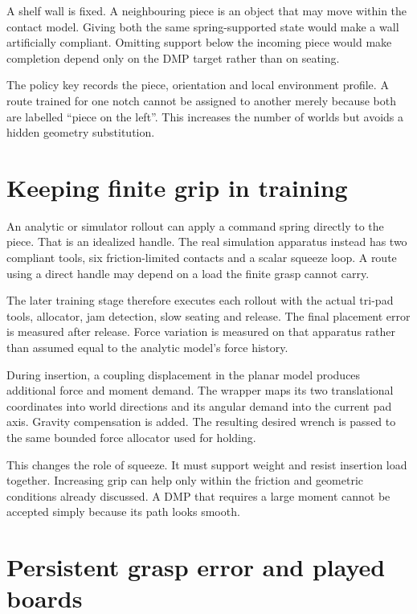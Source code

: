 A shelf wall is fixed. A neighbouring piece is an object that may move within the contact model. Giving both the same spring-supported state would make a wall artificially compliant. Omitting support below the incoming piece would make completion depend only on the DMP target rather than on seating.

The policy key records the piece, orientation and local environment profile. A route trained for one notch cannot be assigned to another merely because both are labelled ``piece on the left''. This increases the number of worlds but avoids a hidden geometry substitution.

\section{Keeping finite grip in training}

An analytic or simulator rollout can apply a command spring directly to the piece. That is an idealized handle. The real simulation apparatus instead has two compliant tools, six friction-limited contacts and a scalar squeeze loop. A route using a direct handle may depend on a load the finite grasp cannot carry.

The later training stage therefore executes each rollout with the actual tri-pad tools, allocator, jam detection, slow seating and release. The final placement error is measured after release. Force variation is measured on that apparatus rather than assumed equal to the analytic model's force history.

During insertion, a coupling displacement in the planar model produces additional force and moment demand. The wrapper maps its two translational coordinates into world directions and its angular demand into the current pad axis. Gravity compensation is added. The resulting desired wrench is passed to the same bounded force allocator used for holding.

This changes the role of squeeze. It must support weight and resist insertion load together. Increasing grip can help only within the friction and geometric conditions already discussed. A DMP that requires a large moment cannot be accepted simply because its path looks smooth.

\section{Persistent grasp error and played boards}
\label{sec:persistent-grasp-error}


